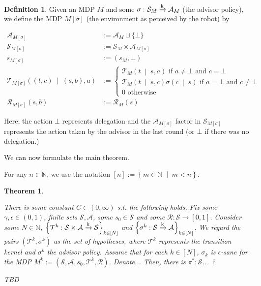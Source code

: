 \documentclass[11pt]{article}
\theoremstyle{definition}
\newtheorem{definition}{Definition}%
\theoremstyle{plain}
\newtheorem{theorem}{Theorem}%
\newcommand{\AP}[1]{\left(#1\right)}
\newcommand{\AC}[1]{\left\{#1\right\}}
\newcommand{\APM}[2]{\left(#1\;\middle\vert\;#2\right)}
\newcommand{\ACM}[2]{\left\{#1\;\middle\vert\;#2\right\}}
\newcommand{\Nats}{\mathbb{N}}
\newcommand{\K}{\xrightarrow{\textnormal{k}}}
\newcommand{\A}{\mathcal{A}}
\newcommand{\St}{\mathcal{S}}
\newcommand{\T}{\mathcal{T}}
\newcommand{\R}{\mathcal{R}}
\begin{document}
\begin{samepage}
\begin{definition}

Given an MDP $M$ and some $\sigma: \St_M \K \A_M$ (the advisor policy), we define the MDP $M[\sigma]$ (the environment as perceived by the robot) by

\begin{align}
\A_{M[\sigma]}&:=\A_M \sqcup \{\bot\} \\
\St_{M[\sigma]}&:=\St_M \times \A_{M[\sigma]} \\ 
s_{M[\sigma]}&:=\AP{s_M,\bot} \\
\T_{M[\sigma]}\APM{\AP{t,c}}{\AP{s,b},a}&:=\begin{cases} \T_M\APM{t}{s,a} \text{ if } a\ne\bot \text{ and } c=\bot \\ \T_M\APM{t}{s,c}\sigma\APM{c}{s} \text{ if } a = \bot \text{ and } c\ne\bot \\ 0 \text{ otherwise} \end{cases} \\
\R_{M[\sigma]}(s,b)&:= \R_M(s)
\end{align}

Here, the action $\bot$ represents delegation and the $\A_{M[\sigma]}$ factor in $\St_{M[\sigma]}$ represents the action taken by the advisor in the last round (or $\bot$ if there was no delegation.)

\end{definition}
\end{samepage}

We can now formulate the main theorem.

For any $n \in \Nats$, we use the notation $[n]:=\ACM{m\in\Nats}{m < n}.$

\begin{samepage}
\begin{theorem}
\label{thm:main}

There is some constant $C \in (0,\infty)$ s.t. the following holds. Fix some $\gamma,\epsilon \in (0,1)$, finite sets $\St,\A$, some $s_0 \in \St$ and some $\R: \St \rightarrow [0,1]$. Consider some $N \in \Nats$, $\AC{\T^k: \St \times \A \K \St}_{k\in[N]}$ and $\AC{\sigma^k :\St \K \A}_{k\in[N]}$. We regard the pairs $(\T^k,\sigma^k)$ as the set of \emph{hypotheses}, where $\T^k$ represents the transition kernel and $\sigma^k$ the advisor policy. Assume that for each $k\in[N]$, $\sigma_k$ is $\epsilon$-sane for the MDP $M^k:=\AP{\St,\A,s_0,\T^k,\R}$. Denote... Then, there is $\pi^*: \St_{}$... ? 

TBD

\end{theorem}
\end{samepage}
\end{document}
